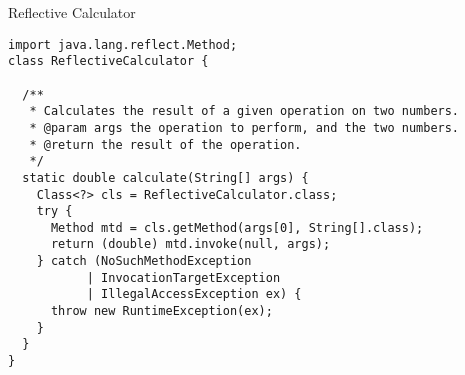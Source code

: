 \begin{cl}{Reflective Calculator}
\begin{lstlisting}[language=MyJava]
import java.lang.reflect.Method;
class ReflectiveCalculator {

  /**
   * Calculates the result of a given operation on two numbers.
   * @param args the operation to perform, and the two numbers.
   * @return the result of the operation.
   */
  static double calculate(String[] args) {
    Class<?> cls = ReflectiveCalculator.class;
    try {
      Method mtd = cls.getMethod(args[0], String[].class);
      return (double) mtd.invoke(null, args);
    } catch (NoSuchMethodException
           | InvocationTargetException
           | IllegalAccessException ex) {
      throw new RuntimeException(ex);
    }
  }
}
\end{lstlisting}
\end{cl}


